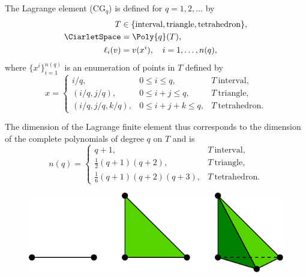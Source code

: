 \begin{definition}
  The Lagrange element ($\mathrm{CG}_q$) is defined for $q = 1, 2,
  \dots$ by
  \begin{align}
    T &\in \{ \mathrm{interval}{},
              \mathrm{triangle}{},
              \mathrm{tetrahedron}{}\}, \\
    \CiarletSpace &= \Poly{q}(T), \\
    \ell_i(v) &= v(x^i), \quad i = 1, \dots, n(q),
  \end{align}
  where $\{ x^i \}_{i=1}^{n(q)}$ is an enumeration of points in $T$
  defined by
  \begin{equation}
    x =
    \left \{
    \begin{array}{lll}
      i/q,             & 0 \leqslant i \leqslant q,         & T~\mathrm{interval}{}, \\
      (i/q, j/q),      & 0 \leqslant i + j \leqslant q,     & T~\mathrm{triangle}{}, \\
      (i/q, j/q, k/q), & 0 \leqslant i + j + k \leqslant q, & T~\mathrm{tetrahedron}{}.
    \end{array}
    \right.
  \end{equation}
\end{definition}
The dimension of the Lagrange finite element thus corresponds to the
dimension of the complete polynomials of degree $q$ on $T$ and is
\begin{equation}
  n(q) =
    \left \{
    \begin{array}{ll}
      q + 1, & T~\mathrm{interval}, \\
      \frac{1}{2} (q + 1)(q + 2), & T~\mathrm{triangle}, \\
      \frac{1}{6} (q + 1)(q + 2)(q + 3), & T~\mathrm{tetrahedron}.
    \end{array}
    \right.
\end{equation}

\begin{figure}
  {\includegraphics[width=\fullfig]{chapters/kirby-6/pdf/P1_1d2d3d.pdf}}
\end{figure}

